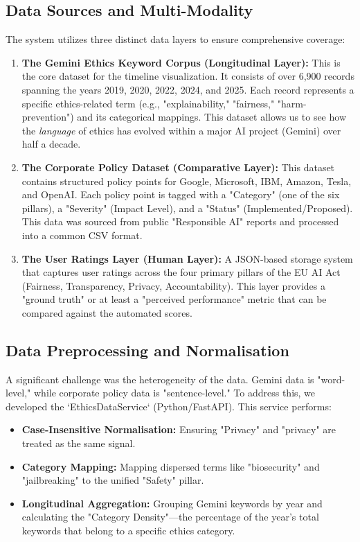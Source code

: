 \documentclass[conference]{IEEEtran}
\begin{document}
\subsection{Data Sources and Multi-Modality}
The system utilizes three distinct data layers to ensure comprehensive coverage:
\begin{enumerate}
    \item \textbf{The Gemini Ethics Keyword Corpus (Longitudinal Layer):} This is the core dataset for the timeline visualization. It consists of over 6,900 records spanning the years 2019, 2020, 2022, 2024, and 2025. Each record represents a specific ethics-related term (e.g., "explainability," "fairness," "harm-prevention") and its categorical mappings. This dataset allows us to see how the \textit{language} of ethics has evolved within a major AI project (Gemini) over half a decade.
    \item \textbf{The Corporate Policy Dataset (Comparative Layer):} This dataset contains structured policy points for Google, Microsoft, IBM, Amazon, Tesla, and OpenAI. Each policy point is tagged with a "Category" (one of the six pillars), a "Severity" (Impact Level), and a "Status" (Implemented/Proposed). This data was sourced from public "Responsible AI" reports and processed into a common CSV format.
    \item \textbf{The User Ratings Layer (Human Layer):} A JSON-based storage system that captures user ratings across the four primary pillars of the EU AI Act (Fairness, Transparency, Privacy, Accountability). This layer provides a "ground truth" or at least a "perceived performance" metric that can be compared against the automated scores.
\end{enumerate}

\subsection{Data Preprocessing and Normalisation}
A significant challenge was the heterogeneity of the data. Gemini data is "word-level," while corporate policy data is "sentence-level." To address this, we developed the `EthicsDataService` (Python/FastAPI). This service performs:
\begin{itemize}
    \item \textbf{Case-Insensitive Normalisation:} Ensuring "Privacy" and "privacy" are treated as the same signal.
    \item \textbf{Category Mapping:} Mapping dispersed terms like "biosecurity" and "jailbreaking" to the unified "Safety" pillar.
    \item \textbf{Longitudinal Aggregation:} Grouping Gemini keywords by year and calculating the "Category Density"—the percentage of the year’s total keywords that belong to a specific ethics category.
\end{itemize}
\end{document}

